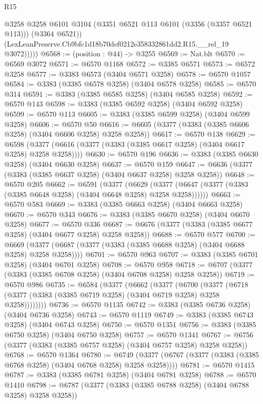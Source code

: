 \begin{lexlean}{R15}
\begin{coremodule}
              @3258
              @3258
              @6101
              @3104
              (@3351 @6521 @113 @6101 (@3356 (@3357 @6521 @113)))
              (@3364 @6521))
            (LexLeanPreserve.Cb9bfc1d18b70def0212e358332861dd2.R15.__rel_19 @3072)))))
@6568 := (position : @44) -> @3255
@6569 := Nat.blt
@6570 := @6569 @3072
@6571 := @6570 @1168
@6572 := @3385 @6571
@6573 := @6572 @3258
@6577 := @3383 @6573 (@3404 @6571 @3258)
@6578 := @6570 @1057
@6584 := @3383 (@3385 @6578 @3258) (@3404 @6578 @3258)
@6585 := @6570 @314
@6591 := @3383 (@3385 @6585 @3258) (@3404 @6585 @3258)
@6592 := @6570 @143
@6598 := @3383 (@3385 @6592 @3258) (@3404 @6592 @3258)
@6599 := @6570 @113
@6605 := @3383 (@3385 @6599 @3258) (@3404 @6599 @3258)
@6606 := @6570 @50
@6616 := @6605 (@3377 (@3383 (@3385 @6606 @3258) (@3404 @6606 @3258) @3258 @3258))
@6617 := @6570 @138
@6629 := @6598 (@3377 (@6616 (@3377 (@3383 (@3385 @6617 @3258) (@3404 @6617 @3258) @3258 @3258))))
@6630 := @6570 @196
@6636 := @3383 (@3385 @6630 @3258) (@3404 @6630 @3258)
@6637 := @6570 @159
@6647 := @6636 (@3377 (@3383 (@3385 @6637 @3258) (@3404 @6637 @3258) @3258 @3258))
@6648 := @6570 @205
@6662 := @6591
    (@3377
      (@6629 (@3377 (@6647 (@3377 (@3383 (@3385 @6648 @3258) (@3404 @6648 @3258) @3258 @3258))))))
@6663 := @6570 @583
@6669 := @3383 (@3385 @6663 @3258) (@3404 @6663 @3258)
@6670 := @6570 @343
@6676 := @3383 (@3385 @6670 @3258) (@3404 @6670 @3258)
@6677 := @6570 @336
@6687 := @6676 (@3377 (@3383 (@3385 @6677 @3258) (@3404 @6677 @3258) @3258 @3258))
@6688 := @6570 @577
@6700 := @6669 (@3377 (@6687 (@3377 (@3383 (@3385 @6688 @3258) (@3404 @6688 @3258) @3258 @3258))))
@6701 := @6570 @963
@6707 := @3383 (@3385 @6701 @3258) (@3404 @6701 @3258)
@6708 := @6570 @958
@6718 := @6707 (@3377 (@3383 (@3385 @6708 @3258) (@3404 @6708 @3258) @3258 @3258))
@6719 := @6570 @986
@6735 := @6584
    (@3377
      (@6662
        (@3377
          (@6700
            (@3377 (@6718 (@3377 (@3383 (@3385 @6719 @3258) (@3404 @6719 @3258) @3258 @3258))))))))
@6736 := @6570 @1135
@6742 := @3383 (@3385 @6736 @3258) (@3404 @6736 @3258)
@6743 := @6570 @1119
@6749 := @3383 (@3385 @6743 @3258) (@3404 @6743 @3258)
@6750 := @6570 @1351
@6756 := @3383 (@3385 @6750 @3258) (@3404 @6750 @3258)
@6757 := @6570 @1341
@6767 := @6756 (@3377 (@3383 (@3385 @6757 @3258) (@3404 @6757 @3258) @3258 @3258))
@6768 := @6570 @1364
@6780 := @6749 (@3377 (@6767 (@3377 (@3383 (@3385 @6768 @3258) (@3404 @6768 @3258) @3258 @3258))))
@6781 := @6570 @1415
@6787 := @3383 (@3385 @6781 @3258) (@3404 @6781 @3258)
@6788 := @6570 @1410
@6798 := @6787 (@3377 (@3383 (@3385 @6788 @3258) (@3404 @6788 @3258) @3258 @3258))

\end{coremodule}
\end{lexlean}
